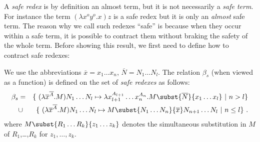 A \emph{safe redex} is by definition an almost term,
but it is not necessarily a \emph{safe term}. For instance the term $(\lambda x^o y^o. x) z$ is a safe redex but it is only an \emph{almost} safe term.
The reason why we call such redexes ``safe'' is because when they occur within a safe term, it is possible to contract them without braking the safety of the whole term. Before showing this result, we first need to define how to contract safe redexes:
\begin{definition}\rm
\label{dfn:saferedex_contraction} We use the abbreviations $\overline{x} =
x_1 \ldots x_n$, $\overline{N} = N_1 \ldots N_l$. The relation
$\beta_s$ (when viewed as a function) is defined on the set of \emph{safe redexes} as follows:
\begin{eqnarray*}
  \beta_s &=&
  \{  \ (\lambda \overline{x}^{\overline A} . M) N_1 \ldots N_l \mapsto \lambda x_{l+1}^{A_{l+1}} \ldots x_n^{A_{n}}. M\subst{\overline{N}}{x_1 \ldots x_l} \ | \ n> l  \} \\
  &\cup&
  \{ \ (\lambda \overline{x}^{\overline A}  . M) N_1 \ldots N_l \mapsto M\subst{N_1 \ldots N_n}{\overline{x}} N_{n+1} \ldots N_l
  \ | \ n\leq l \} \ .
\end{eqnarray*}
where $M\subst{R_1 \ldots R_k}{z_1 \ldots z_k}$ denotes the simultaneous substitution in $M$ of $R_1$,\ldots,$R_k$ for $z_1, \ldots, z_k$.
\end{definition}

